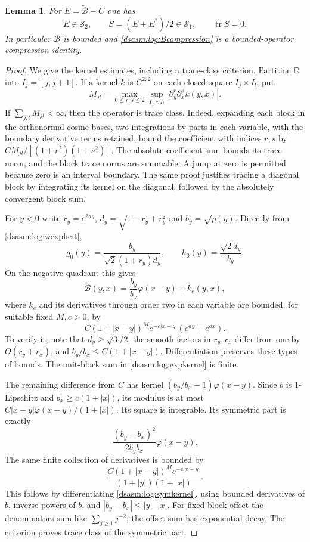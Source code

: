 \documentclass[11pt,letterpaper]{article}
\newtheorem{lemma}[theorem]{Lemma}
\theoremstyle{remark}\newtheorem{remark}[theorem]{Remark}
\newcommand{\R}{\mathbb R}\newcommand{\C}{\mathbb C}\newcommand{\N}{\mathbb N}
\newcommand{\Sone}{\mathcal S_1}\newcommand{\Stwo}{\mathcal S_2}
\DeclareMathOperator{\tr}{tr}\DeclareMathOperator{\Ran}{Ran}
\begin{document}
\begin{lemma}\label{dsasm:log:ideallemma}
For $E=\widetilde{\mathcal B}-C$ one has
\begin{equation}\label{dsasm:log:idealclaim}
 E\in\Stwo,\qquad S=(E+E^*)/2\in\Sone,\qquad \tr S=0.
\end{equation}
In particular $\mathcal B$ is bounded and \eqref{dsasm:log:Bcompression}
is a bounded-operator compression identity.
\end{lemma}
\begin{proof}
We give the kernel estimates, including a trace-class criterion.
Partition $\R$ into $I_j=[j,j+1]$. If a kernel $k$ is $C^{2,2}$
on each closed square $I_j\times I_l$, put
\[
 M_{jl}=\max_{0\le r,s\le2}\sup_{I_j\times I_l}
                |\partial_y^r\partial_x^s k(y,x)|.
\]
If $\sum_{j,l}M_{jl}<\infty$, then the operator is trace class.
Indeed, expanding each block in the orthonormal cosine bases, two
integrations by parts in each variable, with the boundary derivative
terms retained, bound the coefficient with indices $r,s$ by
$CM_{jl}/[(1+r^2)(1+s^2)]$. The absolute coefficient sum bounds its
trace norm, and the block trace norms are summable. A jump at zero
is permitted because zero is an interval boundary. The same proof
justifies tracing a diagonal block by integrating its kernel on the
diagonal, followed by the absolutely convergent block sum.

For $y<0$ write $r_y=e^{2ay}$, $d_y=\sqrt{1-r_y+r_y^2}$ and
$b_y=\sqrt{p(y)}$. Directly from \eqref{dsasm:log:wexplicit},
\[
 g_0(y)=\frac{b_y}{\sqrt2(1+r_y)d_y},\qquad
 h_0(y)=\frac{\sqrt2d_y}{b_y}.
\]
On the negative quadrant this gives
\[
 \widetilde{\mathcal B}(y,x)=\frac{b_y}{b_x}\varphi(x-y)+k_e(y,x),
\]
where $k_e$ and its derivatives through order two in each variable
are bounded, for suitable fixed $M,c>0$, by
\begin{equation}\label{dsasm:log:expkernel}
 C(1+|x-y|)^M e^{-c|x-y|}(e^{ay}+e^{ax}).
\end{equation}
To verify it, note that $d_y\ge\sqrt3/2$, the smooth factors in
$r_y,r_x$ differ from one by $O(r_y+r_x)$, and
$b_y/b_x\le C(1+|x-y|)$. Differentiation preserves these types of
bounds. The unit-block sum in \eqref{dsasm:log:expkernel} is finite.

The remaining difference from $C$ has kernel
$(b_y/b_x-1)\varphi(x-y)$. Since $b$ is 1-Lipschitz and
$b_x\ge c(1+|x|)$, its modulus is at most
$C|x-y|\varphi(x-y)/(1+|x|)$. Its square is integrable.
Its symmetric part is exactly
\begin{equation}\label{dsasm:log:symkernel}
 \frac{(b_y-b_x)^2}{2b_yb_x}\varphi(x-y).
\end{equation}
The same finite collection of derivatives is bounded by
\begin{equation}\label{dsasm:log:symbound}
 \frac{C(1+|x-y|)^M e^{-c|x-y|}}{(1+|y|)(1+|x|)}.
\end{equation}
This follows by differentiating \eqref{dsasm:log:symkernel}, using bounded
derivatives of $b$, inverse powers of $b$, and
$|b_y-b_x|\le|y-x|$. For fixed block offset the denominators sum
like $\sum_{j\ge1}j^{-2}$; the offset sum has exponential decay.
The criterion proves trace class of the symmetric part.


\end{proof}
\end{document}
